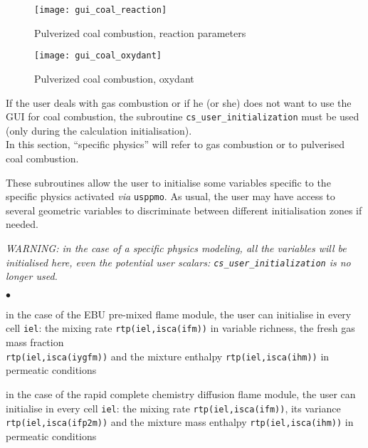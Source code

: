 {{\begin{figure}[!ht]
\begin{center}
\texttt{[image: gui\_coal\_reaction]}
\caption{Pulverized coal combustion, reaction parameters}
\label{fig:Ini-coal4}
\end{center}
\end{figure}

\begin{figure}[!ht]
\begin{center}
\texttt{[image: gui\_coal\_oxydant]}
\caption{Pulverized coal combustion, oxydant}
\label{fig:Ini-coal5}
\end{center}
\end{figure}

If the user deals with gas combustion or if he (or she) does not want to use the
GUI for coal combustion, the subroutine \texttt{cs\_user\_initialization} must be used (only during the calculation initialisation).\\
In this section, ``specific physics'' will refer to gas combustion or
to pulverised coal combustion.

These subroutines allow the user to initialise some variables specific
to the specific physics activated {\em via} \texttt{usppmo}. As usual,
the user may have access to several geometric variables to discriminate
between different initialisation zones if needed.

{\em WARNING: in the case of a specific physics modeling, all the
variables will be initialised here, even the potential user scalars: {\em
\texttt{cs\_user\_initialization}} is no longer used.}


\begin{list}{$\bullet$}{}
       \item in the case of the EBU pre-mixed flame module, the user can
             initialise in every cell \texttt{iel}: the mixing rate
             \texttt{rtp(iel,isca(ifm))} in variable richness, the
             fresh gas mass fraction \\
             \texttt{rtp(iel,isca(iygfm))}
             and the mixture enthalpy \texttt{rtp(iel,isca(ihm))} in
             permeatic conditions

        \item in the case of the rapid complete chemistry diffusion flame
             module, the user can initialise in every cell \texttt{iel}: the
             mixing rate \texttt{rtp(iel,isca(ifm))}, its variance
             \texttt{rtp(iel,isca(ifp2m))} and the mixture mass
             enthalpy \texttt{rtp(iel,isca(ihm))} in permeatic conditions


\end{list}}}
